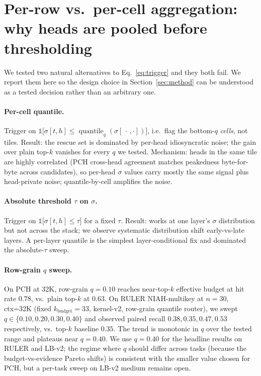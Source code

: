\documentclass[11pt]{article}
\theoremstyle{remark}
\newcommand{\kbudget}{k_{\text{budget}}}
\begin{document}
\section{Per-row vs.\ per-cell aggregation: why heads are pooled before thresholding}\label{app:row-vs-cell}

We tested two natural alternatives to Eq.~\eqref{eq:trigger} and they both fail. We report them here so the design choice in Section~\ref{sec:method} can be understood as a tested decision rather than an arbitrary one.

\paragraph{Per-cell quantile.} Trigger on $\mathbb{1}\!\bigl[\sigma[t,h] \le \operatorname{quantile}_q(\sigma[\,\cdot\,,\cdot])\bigr]$, i.e.\ flag the bottom-$q$ \emph{cells}, not tiles. Result: the rescue set is dominated by per-head idiosyncratic noise; the gain over plain top-$k$ vanishes for every $q$ we tested. Mechanism: heads in the same tile are highly correlated (PCH cross-head agreement matches peakedness byte-for-byte across candidates), so per-head $\sigma$ values carry mostly the same signal plus head-private noise; quantile-by-cell amplifies the noise.

\paragraph{Absolute threshold $\tau$ on $\sigma$.} Trigger on $\mathbb{1}\!\bigl[\sigma[t,h] \le \tau\bigr]$ for a fixed $\tau$. Result: works at one layer's $\sigma$ distribution but not across the stack; we observe systematic distribution shift early-vs-late layers. A per-layer quantile is the simplest layer-conditional fix and dominated the absolute-$\tau$ sweep.

\paragraph{Row-grain $q$ sweep.} On PCH at 32K, row-grain $q = 0.10$ reaches near-top-$k$ effective budget at hit rate $0.78$, vs.\ plain top-$k$ at $0.63$. On RULER NIAH-multikey at $n=30$, ctx=32K (fixed $\kbudget=33$, kernel-v2, row-grain quantile router), we swept $q \in \{0.10, 0.20, 0.30, 0.40\}$ and observed paired recall $0.38, 0.35, 0.47, 0.53$ respectively, vs.\ top-$k$ baseline $0.35$. The trend is monotonic in $q$ over the tested range and plateaus near $q = 0.40$. We use $q = 0.40$ for the headline results on RULER and LB-v2; the regime where $q$ should differ across tasks (because the budget-vs-evidence Pareto shifts) is consistent with the smaller value chosen for PCH, but a per-task sweep on LB-v2 medium remains open.
\end{document}
